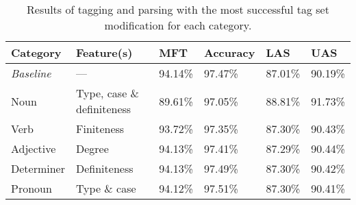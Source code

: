 \documentclass[11pt,a4paper]{article}
\begin{document}
\begin{table*}
    \centering
    \smaller[0.5]
    \begin{tabular}{@{}llllll@{}}
        \toprule
        \textbf{Category} & \textbf{Feature(s)} & \textbf{MFT} &
        \textbf{Accuracy} & \textbf{LAS} & \textbf{UAS} \\
        \midrule
        \emph{Baseline} & --- & 94.14\% & 97.47\% & 87.01\% & 90.19\% \\
        Noun & Type, case \& definiteness & 89.61\% & 97.05\% & 88.81\% &
        91.73\% \\
        Verb & Finiteness & 93.72\% & 97.35\% & 87.30\% & 90.43\% \\
        Adjective & Degree & 94.13\% & 97.41\% & 87.29\% & 90.44\% \\
        Determiner & Definiteness & 94.13\% & 97.49\% & 87.30\% & 90.42\% \\
        Pronoun & Type \& case & 94.12\% & 97.51\% & 87.30\% & 90.41\% \\
        \bottomrule
    \end{tabular}
    \caption{Results of tagging and parsing with the most successful tag set
        modification for each category.}
    \label{respectiveresults}
\end{table*}
\end{document}
